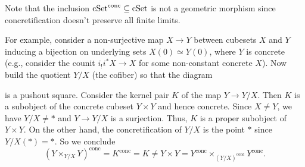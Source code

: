 \begin{remark}
Note that the inclusion $\mathrm{cSet}^\mathrm{conc}\subseteq\mathrm{cSet}$ is not a geometric morphism
since concretification doesn't preserve all finite limits.

For example, consider a non-surjective map $X\to Y$  between cubesets $X$ and $Y$ inducing a bijection on underlying sets $X(0)\simeq Y(0)$, where $Y$ is concrete
(e.g., consider the counit $i_! i^* X\to X$ for some non-constant concrete $X$).
Now build the quotient $Y/X$ (the cofiber) so that the diagram
\begin{center}
\end{center}
is a pushout square.
Consider the kernel pair $K$ of the map $Y\to Y/X$.
Then $K$ is a subobject of the concrete cubeset $Y\times Y$ and hence concrete.
Since $X\ne Y$, we have $Y/X\ne \ast$ and $Y\to Y/X$ is a surjection.
Thus, $K$ is a proper subobject of $Y\times Y$.
On the other hand, the concretification of $Y/X$ is the point $\ast$ since $Y/X(\ast)=\ast$.
So we conclude
\[
    (Y\times_{Y/X}Y)^\mathrm{conc} = K^\mathrm{conc} = K \neq Y\times Y = Y^\mathrm{conc}\times_{(Y/X)^\mathrm{conc}}Y^\mathrm{conc}.
\]
\end{remark}
